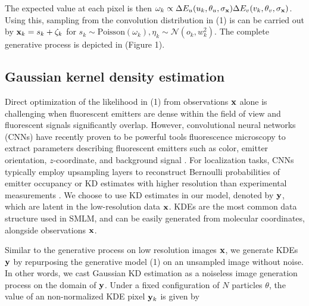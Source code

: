 \documentclass{article}
\begin{document}
The expected value at each pixel is then $\omega_{k}\propto \Delta E_{u}(u_{k},\theta_{u},\sigma_{\bold{x}})\Delta E_{v}(v_{k},\theta_{v},\sigma_{\bold{x}}) $. Using this, sampling from the convolution distribution in (1) is can be carried out by $\bold{x}_{k} = s_{k} + \zeta_{k}$ for $s_{k}\sim \mathrm{Poisson}(\omega_{k}), \eta_{k}\sim \mathcal{N}(o_{k},w_{k}^{2})$. The complete generative process is depicted in (Figure 1). 


\subsection{Gaussian kernel density estimation}

Direct optimization of the likelihood in (1) from observations $\bold{x}$ alone is challenging when fluorescent emitters are dense within the field of view and fluorescent signals significantly overlap. However, convolutional neural networks (CNNs) have recently proven to be powerful tools fluorescence microscopy to extract parameters describing fluorescent emitters such as color, emitter orientation, $z$-coordinate, and background signal \cite{Zhang2018,Kim2019,Zelger2018}. For localization tasks, CNNs typically employ upsampling layers to reconstruct Bernoulli probabilities of emitter occupancy \citep{Speiser2021} or KD estimates with higher resolution than experimental measurements \citep{Nehme2020}. We choose to use KD estimates in our model, denoted by $\bold{y}$, which are latent in the low-resolution data $\bold{x}$. KDEs are the most common data structure used in SMLM, and can be easily generated from molecular coordinates, alongside observations $\bold{x}$.


Similar to the generative process on low resolution images $\bold{x}$, we generate KDEs $\bold{y}$ by repurposing the generative model (1) on an unsampled image without noise. In other words, we cast Gaussian KD estimation as a noiseless image generation process on the domain of $\bold{y}$. Under a fixed configuration of $N$ particles $\theta$, the value of an non-normalized KDE pixel $\bold{y}_{k}$ is given by
\end{document}
